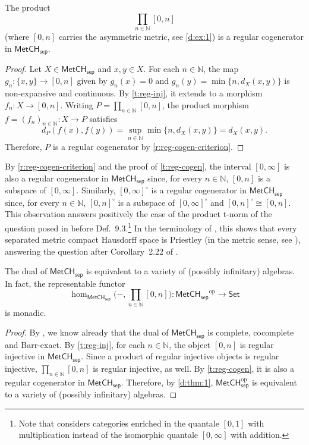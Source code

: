 \documentclass[11pt]{amsart}
\theoremstyle{definition}
\newcommand{\cat}[1]{\mathsf{#1}}
\newcommand{\op}{\mathrm{op}}
\newcommand{\MetCHsep}{\cat{MetCH_{sep}}}
\newcommand{\MetCHsepop}{\cat{MetCH}_\cat{sep}^\op}
\newcommand{\Set}{\cat{Set}}
\newcommand{\N}{\mathbb{N}}
\begin{document}
\begin{theorem} \label{t:reg-cogen}
  The product
  \[
    \prod_{n \in \N} [0,n]
  \]
  (where $[0,n]$ carries the asymmetric metric, see \cref{d:ex:1}) is a regular cogenerator in $\MetCHsep$.
\end{theorem}

      \begin{proof}
  Let \(X\in\MetCHsep\) and \(x,y\in X\). For each \(n\in\N\), the map \(g_n\colon\{x,y\}\to[0,n]\) given by \(g_n(x)=0\) and \(g_n(y)=\min\{n,d_X(x,y)\}\) is non-expansive and continuous. By \cref{t:reg-inj}, it extends to a morphism \(f_n\colon X\to[0,n]\). Writing \(P=\prod_{n\in\N}[0,n]\), the product morphism \(f=(f_n)_{n\in\N}\colon X\to P\) satisfies
  \[
    d_P(f(x),f(y))=\sup_{n\in\N}\min\{n,d_X(x,y)\}=d_X(x,y).
  \]
  Therefore, \(P\) is a regular cogenerator by \cref{r:reg-cogen-criterion}.
\end{proof}



      \begin{remark}
        By \cref{r:reg-cogen-criterion} and the proof of \cref{t:reg-cogen}, the interval \([0,\infty]\) is also a regular cogenerator in \(\MetCHsep\) since, for every \(n\in\N\), \([0,n]\) is a subspace of \([0,\infty]\). Similarly, \([0,\infty]^{\circ}\) is a regular cogenerator in \(\MetCHsep\) since, for every \(n\in\N\), \([0,n]^{\circ}\) is a subspace of \([0,\infty]^{\circ}\) and \([0,n]^{\circ}\cong[0,n]\). This observation answers positively the case of the product t-norm of the question posed in \cite{HN18} before Def.~9.3.\footnote{Note that \cite{HN18} considers categories enriched in the quantale \([0,1]\) with multiplication instead of the isomorphic quantale \([0,\infty]\) with addition.} In the terminology of \cite{HN23}, this shows that every separated metric compact Hausdorff space is Priestley (in the metric sense, see \cite[Def.~2.18]{HN23}), answering the question after Corollary~2.22 of \cite{HN23}.
\end{remark}


\begin{theorem}
  The dual of $\MetCHsep$ is equivalent to a variety of (possibly infinitary) algebras. In fact, the representable functor
  \[
    \hom_{\MetCHsep}\biggl(-,\prod_{n \in \N}[0,n]\biggr) \colon \MetCHsep^\op
    \longrightarrow \Set
  \]
  is monadic.
\end{theorem}

\begin{proof}
  By \cite{AH25}, we know already that the dual of $\MetCHsep$ is complete, cocomplete and Barr-exact.
  By \cref{t:reg-inj}, for each $n \in \N$, the object $[0,n]$ is regular injective in $\MetCHsep$.
  Since a product of regular injective objects is regular injective,
  \begin{math}
    \prod_{n \in \N}[0,n]
  \end{math}
  is regular injective, as well. By \cref{t:reg-cogen}, it is also a regular cogenerator in $\MetCHsep$. Therefore, by \cref{d:thm:1}, $\MetCHsepop$ is equivalent to a variety of (possibly infinitary) algebras.
\end{proof}
\end{document}
